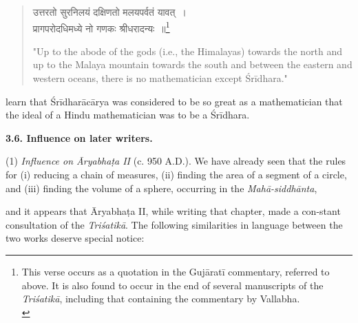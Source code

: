 \documentclass[10pt, openany]{book}
\begin{document}
\begin{quote}
{\qt उत्तरतो सुरनिलयं दक्षिणतो मलयपर्वतं यावत्~। \\
 प्रागपरोदधिमध्ये नो गणकः श्रीधरादन्यः~॥\renewcommand{\thefootnote}{1}\footnote{\hspace{-2mm} \englishfont This verse occurs as a quotation in the Gujāratī commentary, 
referred to above. It is also found to occur in the end of several manuscripts of the \textit{Triśatikā}, including that containing the commentary
by Vallabha.\\}}

{\eqt "Up to the abode of the gods (i.e., the Himalayas)
{towards the north and up to the Malaya mountain}
{towards the south and between the eastern and western}
{oceans, there is no mathematician except Śrīdhara."}}
\end{quote}

{learn that Śrīdharācārya was considered to be so great as a}
{mathematician that the ideal of a Hindu mathematician was}
{to be a Śrīdhara.}
\vspace{3mm}

\textbf{3.6. Influence on later writers.}
\vspace{3mm}

{(1) \textit{Influence on Āryabhaṭa II} (c. 950 A.D.). We have}
{already seen that the rules for (i) reducing a chain of}
{measures, (ii) finding the area of a segment of a circle, and}
{(iii) finding the volume of a sphere, occurring in the \textit{Mahā-siddhānta},}

\newpage

{and it appears that Āryabhaṭa II, while writing that chapter,}
{made a con-stant consultation of the \textit{Triśatikā}. The following}
{similarities in language between the two works deserve special notice:}
\end{document}
